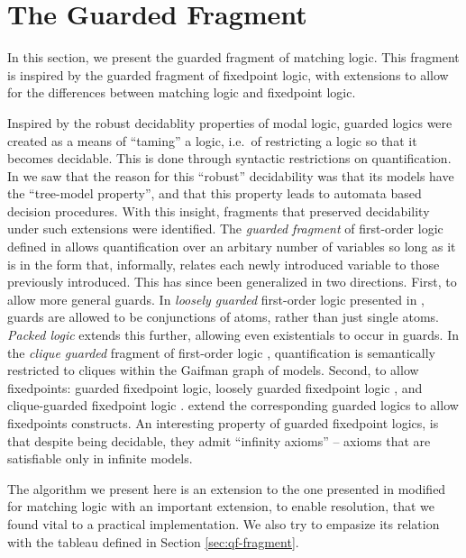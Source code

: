 \newcommand{\hideunlessappendix}[1]{}
\newcommand{\hideinappendix}[1]{#1}


\hypertarget{sec:guarded-fragment}{%
\section{The Guarded Fragment}\label{sec:guarded-fragment}}

In this section, we present the guarded fragment of matching logic.
This fragment is inspired by the guarded fragment of fixedpoint logic\cite{guarded-fixedpoint-logic},
with extensions to allow for the differences between matching logic and fixedpoint logic.

Inspired by the robust decidablity properties of modal logic,
guarded logics were created as a means of ``taming'' a logic,
i.e.~of restricting a logic so that it becomes decidable.
This is done through syntactic restrictions on quantification.
In \cite{why-is-modal-logic-so-robustly-decidable}
we saw that the reason for this ``robust'' decidability was
that its models have the ``tree-model property'',
and that this property leads to automata based decision procedures.
With this insight, fragments that preserved decidability under such extensions were identified.
The \emph{guarded fragment} of first-order logic defined in \cite{modal-languages-and-bounded-fragments} allows
quantification over an arbitary number of variables so long as it is in the form
that, informally, relates each newly introduced variable to those previously
introduced.
This has since been generalized in two directions.
First, to allow more general guards.
In \emph{loosely guarded} first-order logic presented in \cite{loosely-guarded-fol}, guards are allowed to be conjunctions of atoms, rather than just single atoms.
\emph{Packed logic} extends this further, allowing even existentials to occur in guards.
In the \emph{clique guarded} fragment of first-order logic \cite{clique-guarded-logic}, quantification is semantically restricted to cliques within the Gaifman graph of models.
Second, to allow fixedpoints: guarded fixedpoint logic, loosely guarded fixedpoint logic \cite{guarded-fixedpoint-logic}, and clique-guarded fixedpoint logic \cite{clique-guarded-logic}.
extend the corresponding guarded logics to allow fixedpoints constructs.
An interesting property of guarded fixedpoint logics, is that despite being decidable, they admit ``infinity axioms'' --
axioms that are satisfiable only in infinite models.

The algorithm we present here is an extension to the one presented in \cite{guarded-fixedpoint-logic}
modified for matching logic with an important extension, to enable resolution,
that we found vital to a practical implementation.
We also try to empasize its relation with the tableau defined in Section \ref{sec:qf-fragment}.

